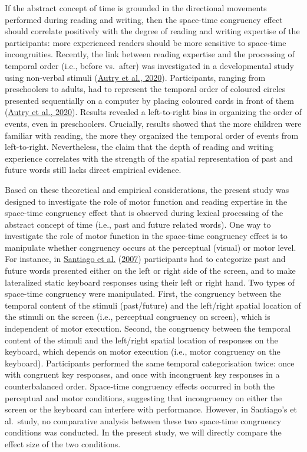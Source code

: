 \documentclass[
  a4paper,12pt,twoside,onecolumn,openright,final,oldfontcommands]{memoir}
\begin{document}
If the abstract concept of time is grounded in the directional movements performed during reading and writing, then the space-time congruency effect should correlate positively with the degree of reading and writing expertise of the participants: more experienced readers should be more sensitive to space-time incongruities. Recently, the link between reading expertise and the processing of temporal order (i.e., before vs.~after) was investigated in a developmental study using non-verbal stimuli (\protect\hyperlink{ref-autry_development_2020}{Autry et al., 2020}). Participants, ranging from preschoolers to adults, had to represent the temporal order of coloured circles presented sequentially on a computer by placing coloured cards in front of them (\protect\hyperlink{ref-autry_development_2020}{Autry et al., 2020}). Results revealed a left-to-right bias in organizing the order of events, even in preschoolers. Crucially, results showed that the more children were familiar with reading, the more they organized the temporal order of events from left-to-right. Nevertheless, the claim that the depth of reading and writing experience correlates with the strength of the spatial representation of past and future words still lacks direct empirical evidence.

Based on these theoretical and empirical considerations, the present study was designed to investigate the role of motor function and reading expertise in the space-time congruency effect that is observed during lexical processing of the abstract concept of time (i.e., past and future related words). One way to investigate the role of motor function in the space-time congruency effect is to manipulate whether congruency occurs at the perceptual (visual) or motor level. For instance, in \protect\hyperlink{ref-santiago_time_2007}{Santiago et al.} (\protect\hyperlink{ref-santiago_time_2007}{2007}) participants had to categorize past and future words presented either on the left or right side of the screen, and to make lateralized static keyboard responses using their left or right hand. Two types of space-time congruency were manipulated. First, the congruency between the temporal content of the stimuli (past/future) and the left/right spatial location of the stimuli on the screen (i.e., perceptual congruency on screen), which is independent of motor execution. Second, the congruency between the temporal content of the stimuli and the left/right spatial location of responses on the keyboard, which depends on motor execution (i.e., motor congruency on the keyboard). Participants performed the same temporal categorisation twice: once with congruent key responses, and once with incongruent key responses in a counterbalanced order. Space-time congruency effects occurred in both the perceptual and motor conditions, suggesting that incongruency on either the screen or the keyboard can interfere with performance. However, in Santiago's et al.~study, no comparative analysis between these two space-time congruency conditions was conducted. In the present study, we will directly compare the effect size of the two conditions.
\end{document}
